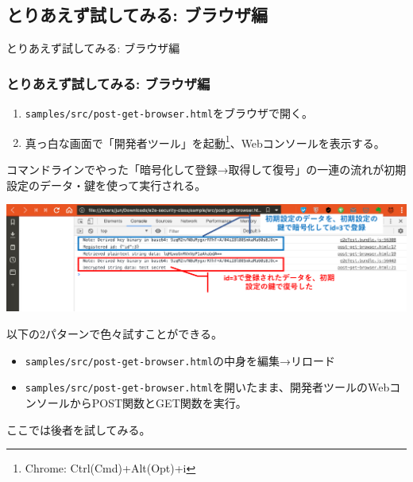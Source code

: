 \documentclass[12pt,dvipdfmx]{beamer}
\begin{document}
\subsection{とりあえず試してみる: ブラウザ編}
\begin{frame}
\centering
{\Large とりあえず試してみる: ブラウザ編}
\end{frame}

\begin{frame}
\frametitle{とりあえず試してみる: ブラウザ編}
\begin{enumerate}
 \item \texttt{samples/src/post-get-browser.html}をブラウザで開く。
 \item 真っ白な画面で「開発者ツール」を起動\footnote[frame]{Chrome: Ctrl(Cmd)+Alt(Opt)+i}、Webコンソールを表示する。
\end{enumerate}

コマンドラインでやった「暗号化して登録→取得して復号」の一連の流れが初期設定のデータ・鍵を使って実行される。

\begin{center}
\includegraphics[width=\linewidth]{FigsSample01/browser-img1.pdf}
\end{center}

\end{frame}

\begin{frame}
以下の2パターンで色々試すことができる。
\begin{itemize}
 \item \texttt{samples/src/post-get-browser.html}の中身を編集→リロード
 \item \texttt{samples/src/post-get-browser.html}を開いたまま、開発者ツールのWebコンソールからPOST関数とGET関数を実行。
\end{itemize}
ここでは後者を試してみる。
\end{frame}
\end{document}
